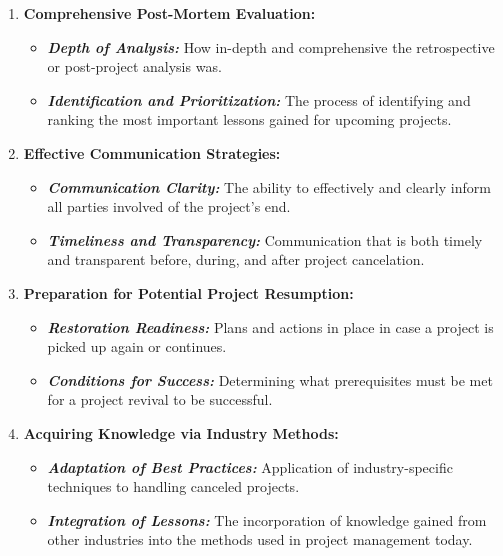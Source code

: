 \documentclass[11pt]{article}
\begin{document}
{\begin{enumerate}
\begin{itemize}
                \end{itemize}
        \item \textbf{Comprehensive Post-Mortem Evaluation:}
                \begin{itemize}
                    \item \textbf{\textit{Depth of Analysis:}} How in-depth and comprehensive the retrospective or post-project analysis was.
                    \item \textbf{\textit{Identification and Prioritization:}} The process of identifying and ranking the most important lessons gained for upcoming projects.
                \end{itemize}
        \item \textbf{Effective Communication Strategies:}
                \begin{itemize}
                    \item \textbf{\textit{Communication Clarity:}} The ability to effectively and clearly inform all parties involved of the project's end.
                    \item \textbf{\textit{Timeliness and Transparency:}} Communication that is both timely and transparent before, during, and after project cancelation.
                \end{itemize}
        \item \textbf{Preparation for Potential Project Resumption:}
                \begin{itemize}
                    \item \textbf{\textit{Restoration Readiness:}} Plans and actions in place in case a project is picked up again or continues.
                    \item \textbf{\textit{Conditions for Success:}} Determining what prerequisites must be met for a project revival to be successful.
                \end{itemize}
        \item \textbf{Acquiring Knowledge via Industry Methods:}
                \begin{itemize}
                    \item \textbf{\textit{Adaptation of Best Practices: }}Application of industry-specific techniques to handling canceled projects.
                    \item \textbf{\textit{Integration of Lessons:}} The incorporation of knowledge gained from other industries into the methods used in project management today.
                \end{itemize}

\end{enumerate}}
\end{document}
